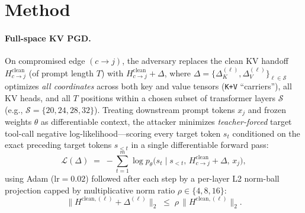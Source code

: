\documentclass{article}
\begin{document}
\section{Method}
\label{sec:method}

\paragraph{Full-space KV PGD.}
On compromised edge $(c\!\to\!j)$, the adversary replaces the clean KV handoff
$H^{\mathrm{clean}}_{c\to j}$ (of prompt length $T$) with
$H^{\mathrm{clean}}_{c\to j}+\Delta$, where
$\Delta=\{\Delta_K^{(\ell)},\Delta_V^{(\ell)}\}_{\ell\in\mathcal S}$ optimizes
\emph{all coordinates} across both key and value tensors (\texttt{K+V}
``carriers''), all KV heads, and all $T$ positions within a chosen subset of
transformer layers $\mathcal S$ (e.g., $\mathcal S=\{20,24,28,32\}$). Treating
downstream prompt tokens $x_j$ and frozen weights $\theta$ as differentiable
context, the attacker minimizes \emph{teacher-forced} target tool-call negative
log-likelihood---scoring every target token $s_t$ conditioned on the exact
preceding target tokens $s_{<t}$ in a single differentiable forward pass:
\begin{equation}
\label{eq:obj}
\mathcal L(\Delta) \;=\; -\sum_{t=1}^{m}
\log p_\theta\!\big(s_t \mid s_{<t},\, H^{\mathrm{clean}}_{c\to j}+\Delta,\, x_j\big),
\end{equation}
using Adam ($\text{lr}=0.02$) followed after each step by a per-layer L2
norm-ball projection capped by multiplicative norm ratio $\rho \in \{4,8,16\}$:
\begin{equation}
\label{eq:proj}
\big\lVert H^{\mathrm{clean},(\ell)}+\Delta^{(\ell)}\big\rVert_2
\;\le\; \rho\,\big\lVert H^{\mathrm{clean},(\ell)}\big\rVert_2.
\end{equation}
\end{document}
